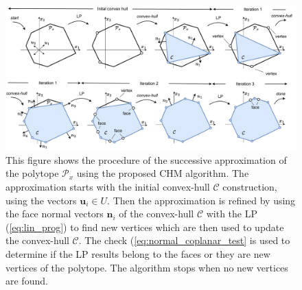 \begin{figure}[!t]
    \centering
    \includegraphics[width=\linewidth]{Papers/images/ichm_full.pdf}
    \vspace{-0.8cm}
    \caption{This figure shows the procedure of the successive approximation of the polytope $\mathcal{P}_x$ using the proposed CHM algorithm. The approximation starts with the initial convex-hull $\mathcal{C}$ construction, using the vectors $\bm{u}_i\in U$. Then the approximation is refined by using the face normal vectors $\bm{n}_i$ of the convex-hull $\mathcal{C}$ with the LP (\ref{eq:lin_prog}) to find new vertices which are then used to update the convex-hull $\mathcal{C}$. The check (\ref{eq:normal_coplanar_test} is used to determine if the LP results belong to the faces or they are new vertices of the polytope. The algorithm stops when no new vertices are found. }
    \label{fig:algo_example}
\end{figure}


